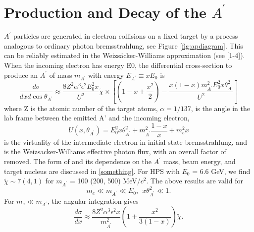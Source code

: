 \section{Production and Decay of the $A^\prime$}
\label{app:ProdAndDecay}

\def \ap {A^\prime}
\def \map {m_{A^\prime}}
\def \thap {\theta_{A^\prime}}


$\ap$ particles are generated in electron collisions on a fixed target by a process analogous to ordinary photon bremsstrahlung, see Figure \ref{fig:apdiagram}.  This can be reliably estimated in the Weizsäcker-Williams approximation (see [1-4]).  When the incoming electron has energy E0, the differential cross-section to produce an $\ap$ of mass $m_{\ap}$ with energy $E_{\ap}\equiv x E_0$ is 
\begin{equation}
\frac{d\sigma}{dxd\cos{\theta_{\ap}}}\approx \frac{8Z^2\alpha^3\epsilon^2 E_0^2 x}{U^2}\tilde{\chi}\times\left[\left(1-x+\frac{x^2}{2}\right)-\frac{x(1-x)m_{\ap}^2E_0^2x\theta_{\ap}^2}{U^2}\right]
\end{equation}
where Z is the atomic number of the target atoms, $\alpha = 1/137$,  is the angle in the lab frame between the emitted A' and the incoming electron, 
\begin{equation}
U(x,\theta_{\ap})=E_0^2x\theta_{\ap}^2+m_{\ap}^2\frac{1-x}{x}+m_e^2x
\end{equation}
is the virtuality of the intermediate electron in initial-state bremsstrahlung, and  is the Weizsacker-Williams effective photon flux, with an overall factor of  removed.  The form of  and its dependence on the $\ap$ mass, beam energy, and target nucleus are discussed in \ref{something}.  For HPS with $E_0$ = 6.6 GeV, we find $\tilde{\chi}\sim 7 (4, 1)$ for $m_{\ap}$ = 100 (200, 500) MeV/$c^2$.
The above results are valid for 
\begin{equation}
m_e\ll m_{\ap}\ll E_0  , ~~ x\theta_{\ap}^2\ll 1.
\end{equation}
For $m_e\ll m_{\ap}$, the angular integration gives
\begin{equation}
\frac{d\sigma}{dx}\approx \frac{8Z^2\alpha^3\epsilon^2 x}{m_{\ap}^2}\left(1+\frac{x^2}{3(1-x)}\right)\tilde{\chi} .
\end{equation}

